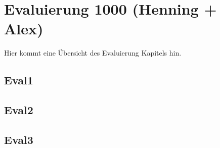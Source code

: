\chapter{Evaluierung 1000 (Henning + Alex)}
\label{sec:Kapitel3}

Hier kommt eine Übersicht des Evaluierung Kapitels hin.

\section{Eval1}
\label{sec:abschnitt3.1}

\section{Eval2}

\section{Eval3}